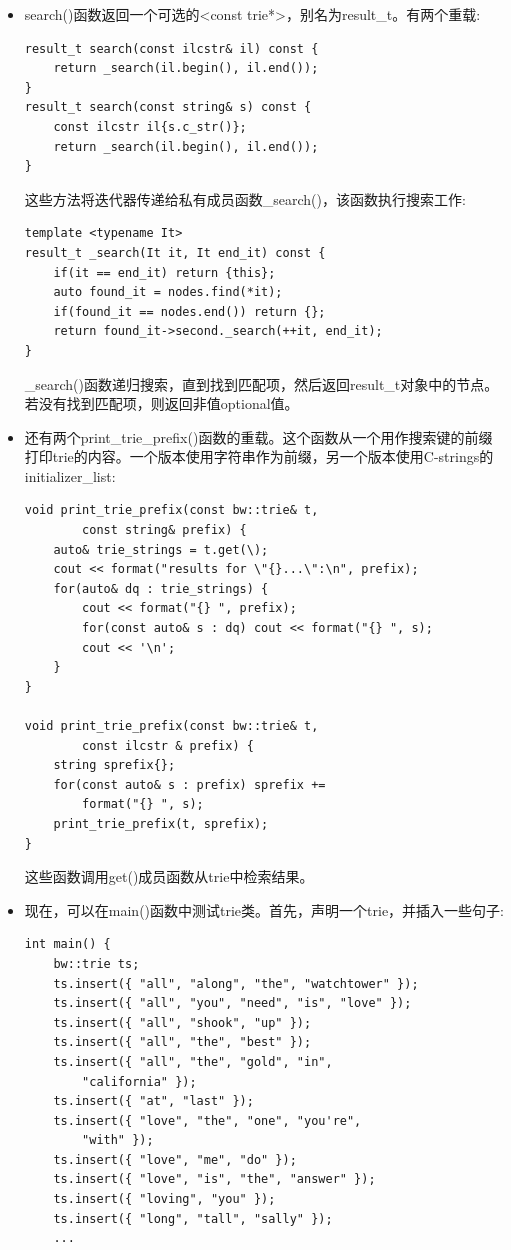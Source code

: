 \begin{itemize}
\item 
search()函数返回一个可选的<const trie*>，别名为result\_t。有两个重载:

\begin{lstlisting}[style=styleCXX]
result_t search(const ilcstr& il) const {
	return _search(il.begin(), il.end());
}
result_t search(const string& s) const {
	const ilcstr il{s.c_str()};
	return _search(il.begin(), il.end());
}
\end{lstlisting}

这些方法将迭代器传递给私有成员函数\_search()，该函数执行搜索工作:

\begin{lstlisting}[style=styleCXX]
template <typename It>
result_t _search(It it, It end_it) const {
	if(it == end_it) return {this};
	auto found_it = nodes.find(*it);
	if(found_it == nodes.end()) return {};
	return found_it->second._search(++it, end_it);
}
\end{lstlisting}

\_search()函数递归搜索，直到找到匹配项，然后返回result\_t对象中的节点。若没有找到匹配项，则返回非值optional值。

\item 
还有两个print\_trie\_prefix()函数的重载。这个函数从一个用作搜索键的前缀打印trie的内容。一个版本使用字符串作为前缀，另一个版本使用C-strings的initializer\_list:

\begin{lstlisting}[style=styleCXX]
void print_trie_prefix(const bw::trie& t,
		const string& prefix) {
	auto& trie_strings = t.get(\);
	cout << format("results for \"{}...\":\n", prefix);
	for(auto& dq : trie_strings) {
		cout << format("{} ", prefix);
		for(const auto& s : dq) cout << format("{} ", s);
		cout << '\n';
	}
}

void print_trie_prefix(const bw::trie& t,
		const ilcstr & prefix) {
	string sprefix{};
	for(const auto& s : prefix) sprefix +=
		format("{} ", s);
	print_trie_prefix(t, sprefix);
}
\end{lstlisting}

这些函数调用get()成员函数从trie中检索结果。

\item 
现在，可以在main()函数中测试trie类。首先，声明一个trie，并插入一些句子:

\begin{lstlisting}[style=styleCXX]
int main() {
	bw::trie ts;
	ts.insert({ "all", "along", "the", "watchtower" });
	ts.insert({ "all", "you", "need", "is", "love" });
	ts.insert({ "all", "shook", "up" });
	ts.insert({ "all", "the", "best" });
	ts.insert({ "all", "the", "gold", "in",
		"california" });
	ts.insert({ "at", "last" });
	ts.insert({ "love", "the", "one", "you're",
		"with" });
	ts.insert({ "love", "me", "do" });
	ts.insert({ "love", "is", "the", "answer" });
	ts.insert({ "loving", "you" });
	ts.insert({ "long", "tall", "sally" });
	...
\end{lstlisting}


\end{itemize}
